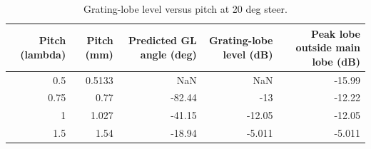 \begin{table}
\caption{Grating-lobe level versus pitch at 20 deg steer.}
\label{tab:T_S4_grating}
\begin{tabular}{rrrrr}
\toprule
Pitch (lambda) & Pitch (mm) & Predicted GL angle (deg) & Grating-lobe level (dB) & Peak lobe outside main lobe (dB) \\
\midrule
0.5 & 0.5133 & NaN & NaN & -15.99 \\
0.75 & 0.77 & -82.44 & -13 & -12.22 \\
1 & 1.027 & -41.15 & -12.05 & -12.05 \\
1.5 & 1.54 & -18.94 & -5.011 & -5.011 \\
\bottomrule
\end{tabular}
\end{table}

